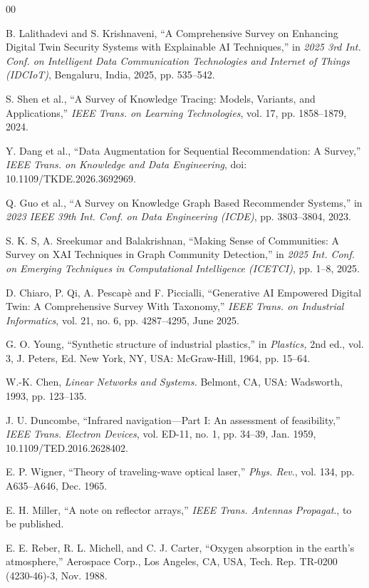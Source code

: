 \documentclass{ieeeaccess}
\begin{document}
\begin{thebibliography}{00}

 B. Lalithadevi and S. Krishnaveni, ``A Comprehensive Survey on Enhancing Digital Twin Security Systems with Explainable AI Techniques,'' in \emph{2025 3rd Int. Conf. on Intelligent Data Communication Technologies and Internet of Things (IDCIoT)}, Bengaluru, India, 2025, pp. 535--542.

 S. Shen et al., ``A Survey of Knowledge Tracing: Models, Variants, and Applications,'' \emph{IEEE Trans. on Learning Technologies}, vol. 17, pp. 1858--1879, 2024.

 Y. Dang et al., ``Data Augmentation for Sequential Recommendation: A Survey,'' \emph{IEEE Trans. on Knowledge and Data Engineering}, doi: 10.1109/TKDE.2026.3692969.

 Q. Guo et al., ``A Survey on Knowledge Graph Based Recommender Systems,'' in \emph{2023 IEEE 39th Int. Conf. on Data Engineering (ICDE)}, pp. 3803--3804, 2023.

 S. K. S, A. Sreekumar and Balakrishnan, ``Making Sense of Communities: A Survey on XAI Techniques in Graph Community Detection,'' in \emph{2025 Int. Conf. on Emerging Techniques in Computational Intelligence (ICETCI)}, pp. 1--8, 2025.

 D. Chiaro, P. Qi, A. Pescapè and F. Piccialli, ``Generative AI Empowered Digital Twin: A Comprehensive Survey With Taxonomy,'' \emph{IEEE Trans. on Industrial Informatics}, vol. 21, no. 6, pp. 4287--4295, June 2025.

 G. O. Young, ``Synthetic structure of industrial plastics,'' in \emph{Plastics,} 2nd ed., vol. 3, J. Peters, Ed. New York, NY, USA: McGraw-Hill, 1964, pp. 15--64.

 W.-K. Chen, \emph{Linear Networks and Systems.} Belmont, CA, USA: Wadsworth, 1993, pp. 123--135.

 J. U. Duncombe, ``Infrared navigation---Part I: An assessment of feasibility,'' \emph{IEEE Trans. Electron Devices}, vol. ED-11, no. 1, pp. 34--39, Jan. 1959, 10.1109/TED.2016.2628402.

 E. P. Wigner, ``Theory of traveling-wave optical laser,'' \emph{Phys. Rev}., vol. 134, pp. A635--A646, Dec. 1965.

 E. H. Miller, ``A note on reflector arrays,'' \emph{IEEE Trans. Antennas Propagat}., to be published.

 E. E. Reber, R. L. Michell, and C. J. Carter, ``Oxygen absorption in the earth's atmosphere,'' Aerospace Corp., Los Angeles, CA, USA, Tech. Rep. TR-0200 (4230-46)-3, Nov. 1988.


\end{thebibliography}
\end{document}
